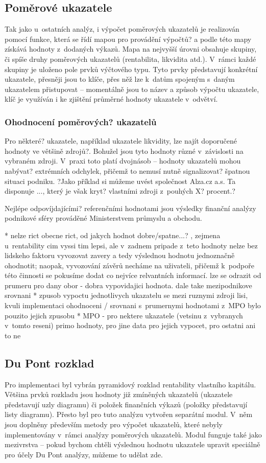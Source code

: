 \subsection{Poměrové ukazatele}
Tak jako u~ostatních analýz, i výpočet poměrových ukazatelů je realizován pomocí funkce, která se řídí mapou pro provádění výpočtů? a podle této mapy získává hodnoty z~dodaných výkazů. Mapa na nejvyšší úrovni obsahuje skupiny, či spíše druhy poměrových ukazatelů (rentabilita, likvidita atd.). V~rámci každé skupiny je uloženo pole prvků výčtového typu. Tyto prvky představují konkrétní ukazatele, přesněji jsou to klíče, přes něž lze k~datům spojeným s~daným ukazatelem přistupovat -- momentálně jsou to název a způsob výpočtu ukazatele, klíč je využíván i ke zjištění průměrné hodnoty ukazatele v~odvětví.


\subsubsection{Ohodnocení poměrových? ukazatelů}
Pro některé? ukazatele, například ukazatele likvidity, lze najít doporučené hodnoty ve většině zdrojů?. Bohužel jsou tyto hodnoty různé v~závislosti na vybraném zdroji. V~praxi toto platí dvojnásob -- hodnoty ukazatelů mohou nabývat? extrémních odchylek, přičemž to nemusí nutně signalizovat? špatnou situaci podniku. ?Jako příklad si můžeme uvést společnost Alza.cz a.s. Ta disponuje ..., který je však kryt? vlastními zdroji z~pouhých X? procent.? 

Nejlépe odpovíjdajícími? referenčními hodnotami jsou výsledky finanční analýzy podnikové sféry prováděné Ministerstvem průmyslu a obchodu. 

* nelze rict obecne rict, od jakych hodnot dobre/spatne...? , zejmena u~rentability cim vyssi tim lepsi, ale v~zadnem pripade z~teto hodnoty nelze bez lidskeho faktoru vyvozovat zavery a tedy výslednou hodnotu jednoznačně ohodnotit; naopak, vyvozování závěrů necháme na uživateli, přičemž k~podpoře této činnosti se pokusíme dodat co nejvíce relvantních informací. lze se odrazit od prumeru pro dany obor - dobra vypovidajici hodnota. dale take mezipodnikove srovnani
* zpusob vypoctu jednotlivych ukazatelu se mezi ruznymi zdroji lisi, kvuli implementaci ohodnoceni / srovnani s~prumernymi hodnotami z~MPO bylo pouzito jejich zpusobu
* MPO - pro nektere ukazatele (vetsinu z~vybranych v~tomto reseni) primo hodnoty, pro jine data pro jejich vypocet, pro ostatni ani to ne


\subsection{Du Pont rozklad}
Pro implementaci byl vybrán pyramidový rozklad rentability vlastního kapitálu. Většina prvků rozkladu jsou hodnoty již zmíněných ukazatelů (ukazatele představují uzly diagramu) či položek finančních výkazů (položky představují listy diagramu). Přesto byl pro tuto analýzu vytvořen separátní modul. V~něm jsou doplněny především metody pro výpočet ukazatelů, které nebyly implementovány v~rámci analýzy poměrových ukazatelů. Modul funguje také jako mezivrstva -- pokud bychom chtěli výslednou hodnotu ukazatele upravit speciálně pro účely Du Pont analýzy, můžeme to udělat zde. 

